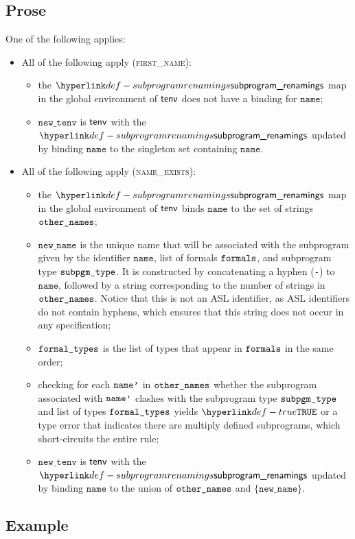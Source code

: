 \documentclass{book}
\newcommand\newtenv[0]{\texttt{new\_tenv}}
\newcommand\name[0]{\texttt{name}}
\newcommand\newname[0]{\texttt{new\_name}}
\begin{document}
\subsection{Prose}
One of the following applies:
\begin{itemize}
  \item All of the following apply (\textsc{first\_name}):
  \begin{itemize}
    \item the $\subprogramrenamings$ map in the global environment of $\textsf{tenv}$ does not have a binding for $\name$;
    \item $\newtenv$ is $\textsf{tenv}$ with the $\subprogramrenamings$ updated by binding $\name$ to the singleton set containing
          $\name$.
  \end{itemize}

  \item All of the following apply (\textsc{name\_exists}):
  \begin{itemize}
    \item the $\subprogramrenamings$ map in the global environment of $\textsf{tenv}$ binds $\name$ to the set of strings $\texttt{other\_names}$;
    \item $\newname$ is the unique name that will be associated with the subprogram given by the identifier $\name$, list of formals $\texttt{formals}$,
          and subprogram type $\texttt{subpgm\_type}$. It is constructed by concatenating a hyphen (\texttt{-}) to $\name$, followed
          by a string corresponding to the number of strings in $\texttt{other\_names}$.
          Notice that this is not an ASL identifier, as ASL identifiers do not contain hyphens, which ensures that this string
          does not occur in any specification;
    \item $\texttt{formal\_types}$ is the list of types that appear in $\texttt{formals}$ in the same order;
    \item checking for each $\texttt{name'}$ in $\texttt{other\_names}$ whether the subprogram associated with $\texttt{name'}$ clashes
          with the subprogram type $\texttt{subpgm\_type}$ and list of types $\texttt{formal\_types}$ yields $\True$
          or a type error that indicates there are multiply defined subprograms, which short-circuits the entire rule;
    \item $\newtenv$ is $\textsf{tenv}$ with the $\subprogramrenamings$ updated by binding $\name$ to the union of $\texttt{other\_names}$ and
          $\{\newname\}$.
  \end{itemize}
\end{itemize}

\subsection{Example}
\end{document}
